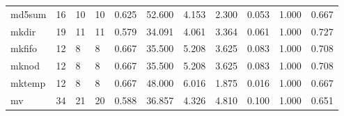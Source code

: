 \begin{longtable}{lp{1.8cm}p{1.8cm}p{1.8cm}p{1.8cm}p{1.8cm}p{1.8cm}p{1.8cm}p{1.8cm}p{1.8cm}p{1.8cm}}
md5sum    &                           16 &                 10 &                                10 &                                      0.625 &                                 52.600 &                                        4.153 &                             2.300 &                                   0.053 &                              1.000 &                                              0.667 \\
mkdir     &                           19 &                 11 &                                11 &                                      0.579 &                                 34.091 &                                        4.061 &                             3.364 &                                   0.061 &                              1.000 &                                              0.727 \\
mkfifo    &                           12 &                  8 &                                 8 &                                      0.667 &                                 35.500 &                                        5.208 &                             3.625 &                                   0.083 &                              1.000 &                                              0.708 \\
mknod     &                           12 &                  8 &                                 8 &                                      0.667 &                                 35.500 &                                        5.208 &                             3.625 &                                   0.083 &                              1.000 &                                              0.708 \\
mktemp    &                           12 &                  8 &                                 8 &                                      0.667 &                                 48.000 &                                        6.016 &                             1.875 &                                   0.016 &                              1.000 &                                              0.667 \\
mv        &                           34 &                 21 &                                20 &                                      0.588 &                                 36.857 &                                        4.326 &                             4.810 &                                   0.100 &                              1.000 &                                              0.651 \\

\end{longtable}
